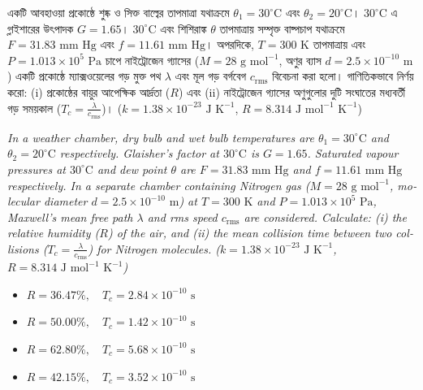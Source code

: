 \documentclass[12pt, a4paper]{article}
\begin{document}
\begin{tcolorbox}[questionbox={প্রশ্ন (Question) 25}]
    \noindent
    একটি আবহাওয়া প্রকোষ্ঠে শুষ্ক ও সিক্ত বাল্বের তাপমাত্রা যথাক্রমে $\theta_1 = 30^\circ\text{C}$ এবং $\theta_2 = 20^\circ\text{C}$। $30^\circ\text{C}$ এ গ্লাইশারের উৎপাদক $G = 1.65$। $30^\circ\text{C}$ এবং শিশিরাঙ্ক $\theta$ তাপমাত্রায় সম্পৃক্ত বাষ্পচাপ যথাক্রমে $F = 31.83\text{ mm Hg}$ এবং $f = 11.61\text{ mm Hg}$। অপরদিকে, $T = 300\text{ K}$ তাপমাত্রায় এবং $P = 1.013 \times 10^5\text{ Pa}$ চাপে নাইট্রোজেন গ্যাসের ($M = 28\text{ g mol}^{-1}$, অণুর ব্যাস $d = 2.5 \times 10^{-10}\text{ m}$) একটি প্রকোষ্ঠে ম্যাক্সওয়েলের গড় মুক্ত পথ $\lambda$ এবং মূল গড় বর্গবেগ $c_{\text{rms}}$ বিবেচনা করা হলো। গাণিতিকভাবে নির্ণয় করো: (i) প্রকোষ্ঠের বায়ুর আপেক্ষিক আর্দ্রতা ($R$) এবং (ii) নাইট্রোজেন গ্যাসের অণুগুলোর দুটি সংঘাতের মধ্যবর্তী গড় সময়কাল ($T_c = \frac{\lambda}{c_{\text{rms}}}$)। ($k = 1.38 \times 10^{-23}\text{ J K}^{-1}$, $R = 8.314\text{ J mol}^{-1}\text{ K}^{-1}$)
    
    \vspace{0.8em}
    \begin{english}
    \noindent\textit{\color{darkgray}
    In a weather chamber, dry bulb and wet bulb temperatures are $\theta_1 = 30^\circ\text{C}$ and $\theta_2 = 20^\circ\text{C}$ respectively. Glaisher's factor at $30^\circ\text{C}$ is $G = 1.65$. Saturated vapour pressures at $30^\circ\text{C}$ and dew point $\theta$ are $F = 31.83\text{ mm Hg}$ and $f = 11.61\text{ mm Hg}$ respectively. In a separate chamber containing Nitrogen gas ($M = 28\text{ g mol}^{-1}$, molecular diameter $d = 2.5 \times 10^{-10}\text{ m}$) at $T = 300\text{ K}$ and $P = 1.013 \times 10^5\text{ Pa}$, Maxwell's mean free path $\lambda$ and rms speed $c_{\text{rms}}$ are considered. Calculate: (i) the relative humidity ($R$) of the air, and (ii) the mean collision time between two collisions ($T_c = \frac{\lambda}{c_{\text{rms}}}$) for Nitrogen molecules. ($k = 1.38 \times 10^{-23}\text{ J K}^{-1}$, $R = 8.314\text{ J mol}^{-1}\text{ K}^{-1}$)
    }
    \end{english}
\end{tcolorbox}

\begin{itemize}[label={}, leftmargin=1cm, itemsep=0.5em]
    \item[\textbf{A)}] $R = 36.47\%, \quad T_c = 2.84 \times 10^{-10}\text{ s}$
    \item[\textbf{B)}] $R = 50.00\%, \quad T_c = 1.42 \times 10^{-10}\text{ s}$
    \item[\textbf{C)}] $R = 62.80\%, \quad T_c = 5.68 \times 10^{-10}\text{ s}$
    \item[\textbf{D)}] $R = 42.15\%, \quad T_c = 3.52 \times 10^{-10}\text{ s}$
\end{itemize}
\end{document}
